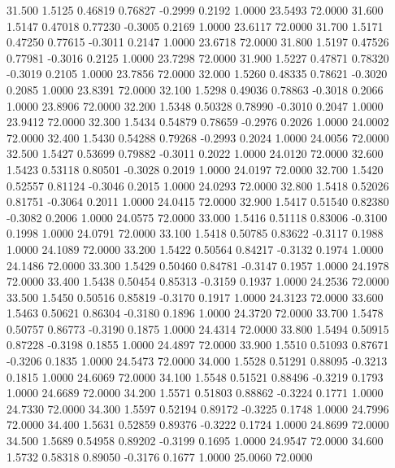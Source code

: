   31.500   1.5125   0.46819   0.76827  -0.2999   0.2192   1.0000  23.5493  72.0000
  31.600   1.5147   0.47018   0.77230  -0.3005   0.2169   1.0000  23.6117  72.0000
  31.700   1.5171   0.47250   0.77615  -0.3011   0.2147   1.0000  23.6718  72.0000
  31.800   1.5197   0.47526   0.77981  -0.3016   0.2125   1.0000  23.7298  72.0000
  31.900   1.5227   0.47871   0.78320  -0.3019   0.2105   1.0000  23.7856  72.0000
  32.000   1.5260   0.48335   0.78621  -0.3020   0.2085   1.0000  23.8391  72.0000
  32.100   1.5298   0.49036   0.78863  -0.3018   0.2066   1.0000  23.8906  72.0000
  32.200   1.5348   0.50328   0.78990  -0.3010   0.2047   1.0000  23.9412  72.0000
  32.300   1.5434   0.54879   0.78659  -0.2976   0.2026   1.0000  24.0002  72.0000
  32.400   1.5430   0.54288   0.79268  -0.2993   0.2024   1.0000  24.0056  72.0000
  32.500   1.5427   0.53699   0.79882  -0.3011   0.2022   1.0000  24.0120  72.0000
  32.600   1.5423   0.53118   0.80501  -0.3028   0.2019   1.0000  24.0197  72.0000
  32.700   1.5420   0.52557   0.81124  -0.3046   0.2015   1.0000  24.0293  72.0000
  32.800   1.5418   0.52026   0.81751  -0.3064   0.2011   1.0000  24.0415  72.0000
  32.900   1.5417   0.51540   0.82380  -0.3082   0.2006   1.0000  24.0575  72.0000
  33.000   1.5416   0.51118   0.83006  -0.3100   0.1998   1.0000  24.0791  72.0000
  33.100   1.5418   0.50785   0.83622  -0.3117   0.1988   1.0000  24.1089  72.0000
  33.200   1.5422   0.50564   0.84217  -0.3132   0.1974   1.0000  24.1486  72.0000
  33.300   1.5429   0.50460   0.84781  -0.3147   0.1957   1.0000  24.1978  72.0000
  33.400   1.5438   0.50454   0.85313  -0.3159   0.1937   1.0000  24.2536  72.0000
  33.500   1.5450   0.50516   0.85819  -0.3170   0.1917   1.0000  24.3123  72.0000
  33.600   1.5463   0.50621   0.86304  -0.3180   0.1896   1.0000  24.3720  72.0000
  33.700   1.5478   0.50757   0.86773  -0.3190   0.1875   1.0000  24.4314  72.0000
  33.800   1.5494   0.50915   0.87228  -0.3198   0.1855   1.0000  24.4897  72.0000
  33.900   1.5510   0.51093   0.87671  -0.3206   0.1835   1.0000  24.5473  72.0000
  34.000   1.5528   0.51291   0.88095  -0.3213   0.1815   1.0000  24.6069  72.0000
  34.100   1.5548   0.51521   0.88496  -0.3219   0.1793   1.0000  24.6689  72.0000
  34.200   1.5571   0.51803   0.88862  -0.3224   0.1771   1.0000  24.7330  72.0000
  34.300   1.5597   0.52194   0.89172  -0.3225   0.1748   1.0000  24.7996  72.0000
  34.400   1.5631   0.52859   0.89376  -0.3222   0.1724   1.0000  24.8699  72.0000
  34.500   1.5689   0.54958   0.89202  -0.3199   0.1695   1.0000  24.9547  72.0000
  34.600   1.5732   0.58318   0.89050  -0.3176   0.1677   1.0000  25.0060  72.0000
